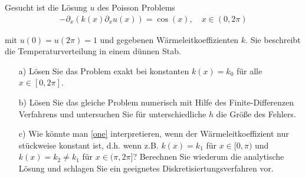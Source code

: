 \begin{exercise}
  Gesucht ist die Lösung $u$ des Poisson Problems
  \begin{align}\label{one}
    -\partial_x (k(x)\partial_x u(x))
    =
    \cos(x),
    \quad
    x \in (0,2\pi)
  \end{align}

  mit $u(0) = u(2\pi) = 1$ und gegebenen Wärmeleitkoeffizienten $k$. Sie
  beschreibt die Temperaturverteilung in einem dünnen Stab.

  \begin{itemize}
  \item[a)] Lösen Sie das Problem exakt bei konstanten $k(x) = k_0$ für alle
  $x \in [0, 2\pi]$.

  \item[b)] Lösen Sie das gleiche Problem numerisch mit Hilfe des Finite-Differenzen
  Verfahrens und untersuchen Sie für unterschiedliche $h$ die Größe des Fehlers.

  \item[c)] Wie könnte man \eqref{one} interpretieren, wenn der Wärmeleitkoeffizient
  nur stückweise konstant ist, d.h. wenn z.B. $k(x) = k_1$ für $x \in [0, \pi)$ und
  $k(x) = k_2 \neq k_1$ für $x \in (\pi, 2\pi]$? Berechnen Sie wiederum die analytische
  Lösung und schlagen Sie ein geeignetes Diskretisiertungsverfahren vor.
  \end{itemize}
\end{exercise}

